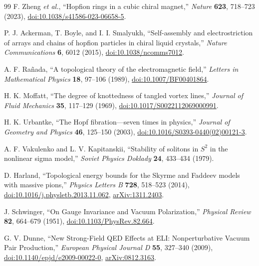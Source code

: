 \documentclass[aps,prd,reprint,nofootinbib,superscriptaddress,floatfix]{revtex4-2}
\numberwithin{equation}{section}
\theoremstyle{definition}
\theoremstyle{plain}
\begin{document}
\begin{thebibliography}{99}
F. Zheng \emph{et al.},
``Hopfion rings in a cubic chiral magnet,''
\emph{Nature} \textbf{623}, 718--723 (2023),
\href{https://doi.org/10.1038/s41586-023-06658-5}{doi:10.1038/s41586-023-06658-5}.

P. J. Ackerman, T. Boyle, and I. I. Smalyukh,
``Self-assembly and electrostriction of arrays and chains of hopfion particles in chiral liquid crystals,''
\emph{Nature Communications} \textbf{6}, 6012 (2015),
\href{https://doi.org/10.1038/ncomms7012}{doi:10.1038/ncomms7012}.

A. F. Rañada,
``A topological theory of the electromagnetic field,''
\emph{Letters in Mathematical Physics} \textbf{18}, 97--106 (1989),
\href{https://doi.org/10.1007/BF00401864}{doi:10.1007/BF00401864}.

H. K. Moffatt,
``The degree of knottedness of tangled vortex lines,''
\emph{Journal of Fluid Mechanics} \textbf{35}, 117--129 (1969),
\href{https://doi.org/10.1017/S0022112069000991}{doi:10.1017/S0022112069000991}.

H. K. Urbantke,
``The Hopf fibration---seven times in physics,''
\emph{Journal of Geometry and Physics} \textbf{46}, 125--150 (2003),
\href{https://doi.org/10.1016/S0393-0440(02)00121-3}{doi:10.1016/S0393-0440(02)00121-3}.

A. F. Vakulenko and L. V. Kapitanskii,
``Stability of solitons in \(S^2\) in the nonlinear sigma model,''
\emph{Soviet Physics Doklady} \textbf{24}, 433--434 (1979).

D. Harland,
``Topological energy bounds for the Skyrme and Faddeev models with massive pions,''
\emph{Physics Letters B} \textbf{728}, 518--523 (2014),
\href{https://doi.org/10.1016/j.physletb.2013.11.062}{doi:10.1016/j.physletb.2013.11.062},
\href{https://arxiv.org/abs/1311.2403}{arXiv:1311.2403}.

J. Schwinger,
``On Gauge Invariance and Vacuum Polarization,''
\emph{Physical Review} \textbf{82}, 664--679 (1951),
\href{https://doi.org/10.1103/PhysRev.82.664}{doi:10.1103/PhysRev.82.664}.

G. V. Dunne,
``New Strong-Field QED Effects at ELI: Nonperturbative Vacuum Pair Production,''
\emph{European Physical Journal D} \textbf{55}, 327--340 (2009),
\href{https://doi.org/10.1140/epjd/e2009-00022-0}{doi:10.1140/epjd/e2009-00022-0},
\href{https://arxiv.org/abs/0812.3163}{arXiv:0812.3163}.





\end{thebibliography}
\end{document}

